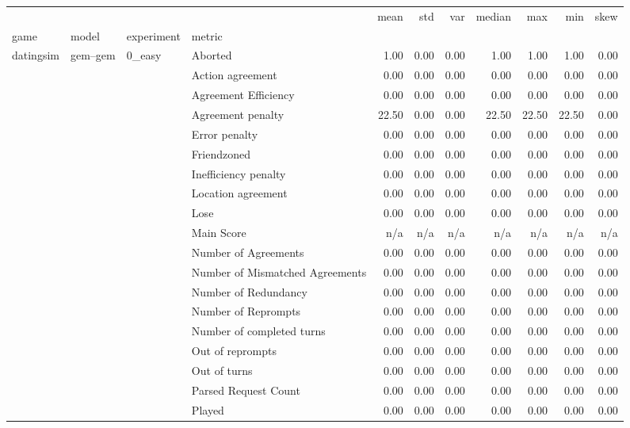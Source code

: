 \begin{tabular}{llllrrrrrrr}
\toprule
 &  &  &  & mean & std & var & median & max & min & skew \\
game & model & experiment & metric &  &  &  &  &  &  &  \\
\midrule
\multirow[t]{2646}{*}{datingsim} & \multirow[t]{378}{*}{gem--gem} & \multirow[t]{27}{*}{0_easy} & Aborted & 1.00 & 0.00 & 0.00 & 1.00 & 1.00 & 1.00 & 0.00 \\
 &  &  & Action agreement & 0.00 & 0.00 & 0.00 & 0.00 & 0.00 & 0.00 & 0.00 \\
 &  &  & Agreement Efficiency & 0.00 & 0.00 & 0.00 & 0.00 & 0.00 & 0.00 & 0.00 \\
 &  &  & Agreement penalty & 22.50 & 0.00 & 0.00 & 22.50 & 22.50 & 22.50 & 0.00 \\
 &  &  & Error penalty & 0.00 & 0.00 & 0.00 & 0.00 & 0.00 & 0.00 & 0.00 \\
 &  &  & Friendzoned & 0.00 & 0.00 & 0.00 & 0.00 & 0.00 & 0.00 & 0.00 \\
 &  &  & Inefficiency penalty & 0.00 & 0.00 & 0.00 & 0.00 & 0.00 & 0.00 & 0.00 \\
 &  &  & Location agreement & 0.00 & 0.00 & 0.00 & 0.00 & 0.00 & 0.00 & 0.00 \\
 &  &  & Lose & 0.00 & 0.00 & 0.00 & 0.00 & 0.00 & 0.00 & 0.00 \\
 &  &  & Main Score & n/a & n/a & n/a & n/a & n/a & n/a & n/a \\
 &  &  & Number of Agreements & 0.00 & 0.00 & 0.00 & 0.00 & 0.00 & 0.00 & 0.00 \\
 &  &  & Number of Mismatched Agreements & 0.00 & 0.00 & 0.00 & 0.00 & 0.00 & 0.00 & 0.00 \\
 &  &  & Number of Redundancy & 0.00 & 0.00 & 0.00 & 0.00 & 0.00 & 0.00 & 0.00 \\
 &  &  & Number of Reprompts & 0.00 & 0.00 & 0.00 & 0.00 & 0.00 & 0.00 & 0.00 \\
 &  &  & Number of completed turns & 0.00 & 0.00 & 0.00 & 0.00 & 0.00 & 0.00 & 0.00 \\
 &  &  & Out of reprompts & 0.00 & 0.00 & 0.00 & 0.00 & 0.00 & 0.00 & 0.00 \\
 &  &  & Out of turns & 0.00 & 0.00 & 0.00 & 0.00 & 0.00 & 0.00 & 0.00 \\
 &  &  & Parsed Request Count & 0.00 & 0.00 & 0.00 & 0.00 & 0.00 & 0.00 & 0.00 \\
 &  &  & Played & 0.00 & 0.00 & 0.00 & 0.00 & 0.00 & 0.00 & 0.00 \\

\end{tabular}
